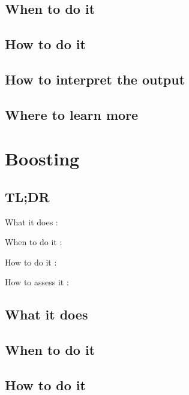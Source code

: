 \documentclass[
]{book}
\begin{document}
\hypertarget{when-to-do-it-17}{%
\section{When to do it}\label{when-to-do-it-17}}

\hypertarget{how-to-do-it-17}{%
\section{How to do it}\label{how-to-do-it-17}}

\hypertarget{how-to-interpret-the-output-17}{%
\section{How to interpret the output}\label{how-to-interpret-the-output-17}}

\hypertarget{where-to-learn-more-17}{%
\section{Where to learn more}\label{where-to-learn-more-17}}

\hypertarget{boosting}{%
\chapter{Boosting}\label{boosting}}

\hypertarget{tldr-18}{%
\section{TL;DR}\label{tldr-18}}

What it does
:

When to do it
:

How to do it
:

How to assess it
:

\hypertarget{what-it-does-18}{%
\section{What it does}\label{what-it-does-18}}

\hypertarget{when-to-do-it-18}{%
\section{When to do it}\label{when-to-do-it-18}}

\hypertarget{how-to-do-it-18}{%
\section{How to do it}\label{how-to-do-it-18}}
\end{document}
